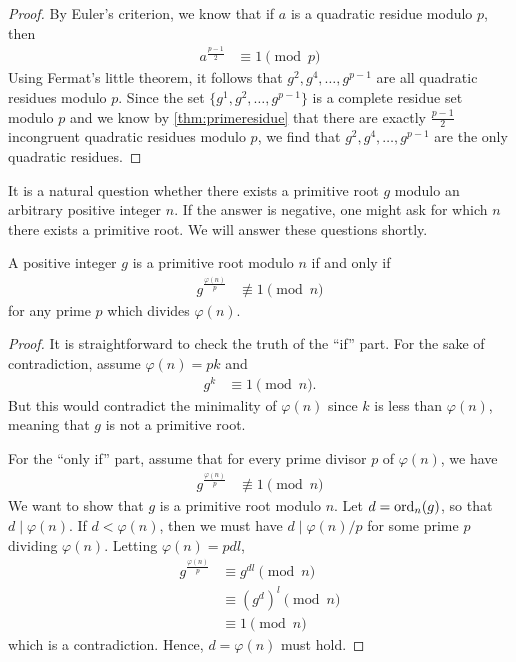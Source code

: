 \begin{proof}
	By Euler's criterion, we know that if $a$ is a quadratic residue modulo $p$, then
		\begin{align*}
			a^{\frac{p-1}{2}}
				& \equiv 1 \pmod p
		\end{align*}
	Using Fermat's little theorem, it follows that $g^2,g^4,\ldots,g^{p-1}$ are all quadratic residues modulo $p$. Since the set $\{g^1,g^2,\ldots,g^{p-1}\}$ is a complete residue set modulo $p$ and we know by \autoref{thm:primeresidue} that there are exactly $\frac{p-1}{2}$ incongruent quadratic residues modulo $p$, we find that $g^2,g^4,\ldots,g^{p-1}$ are the only quadratic residues.
\end{proof}
It is a natural question whether there exists a primitive root $g$ modulo an arbitrary positive integer $n$. If the answer is negative, one might ask for which $n$ there exists a primitive root. We will answer these questions shortly.
\begin{theorem}\label{thm:prTest}
	A positive integer $g$ is a primitive root modulo $n$ if and only if
		\begin{align*}
			g^{\frac{\varphi(n)}{p}}
				& \not\equiv1\pmod n
		\end{align*}
	for any prime $p$ which divides $\varphi(n)$.
\end{theorem}

\begin{proof}
	It is straightforward to check the truth of the ``if'' part. For the sake of contradiction, assume $\varphi(n)=pk$ and
		\begin{align*}
			g^{k} & \equiv1\pmod n.
		\end{align*}
	But this would contradict the minimality of $\varphi(n)$ since $k$ is less than $\varphi(n)$, meaning that $g$ is not a primitive root.

	For the ``only if'' part, assume that for every prime divisor $p$ of $\varphi(n)$, we have
		\begin{align*}
			g^{\frac{\varphi(n)}{p}}
				& \not\equiv1\pmod n
		\end{align*}
	We want to show that $g$ is a primitive root modulo $n$. Let $d=\operatorname{ord}_n(g)$, so that $d \mid \varphi(n)$. If $d<\varphi(n)$, then we must have $d\mid {\varphi(n)}/{p}$ for some prime $p$ dividing $\varphi(n)$. Letting $\varphi(n)=pdl$,
		\begin{align*}
			g^{\frac{\varphi(n)}{p}}
				& \equiv g^{dl}\pmod{n}\\
				& \equiv \left(g^d\right)^l\pmod{n}\\
				& \equiv1\pmod n
		\end{align*}
	which is a contradiction. Hence, $d=\varphi(n)$ must hold.
\end{proof}

